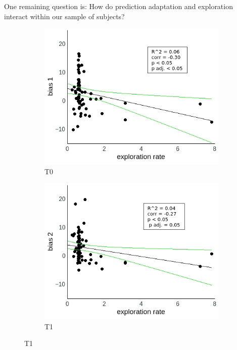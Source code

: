 \documentclass[a4paper]{scrreprt}
\begin{document}
One remaining question is: How do prediction adaptation and exploration interact within our sample of subjects?

\begin{figure}
\centering
\begin{subfigure}[b]{0.49\textwidth}
        \includegraphics[width=\textwidth]{figs/sec3/temp/temp_diff_1_mod1mod1.jpeg}
        \caption{T0}
    \end{subfigure}
    \begin{subfigure}[b]{0.49\textwidth}
        \includegraphics[width=\textwidth]{figs/sec3/temp/temp_diff_2_mod1mod1.jpeg}
        \caption{T1}
    \end{subfigure}


\end{figure}
\end{document}
